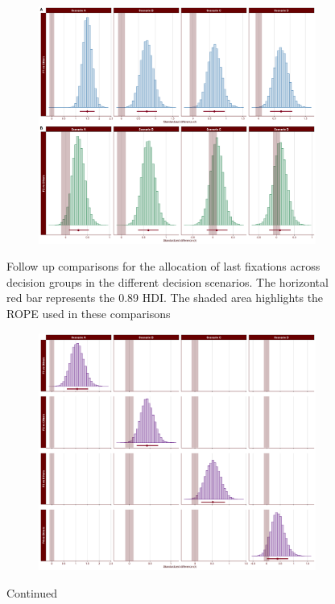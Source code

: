 \documentclass[
  english,
  man]{apa6}
\begin{document}
\begin{appendix}
\begin{figure}[!b]
\centering
\begin{subfigure}{1\textwidth}
\includegraphics[width=\linewidth]{Figures/SE2_last_scenario_comparisons_A.png}
\label{fig:last-scenario-comparisons-A}
\end{subfigure}
\caption[]{Follow up comparisons for the allocation of last fixations across decision groups in the different decision scenarios. The horizontal red bar represents the 0.89 HDI. The shaded area highlights the ROPE used in these comparisons}
\end{figure}

\medskip

\begin{figure}[ht]\ContinuedFloat
\centering
\begin{subfigure}{1\textwidth}
\includegraphics[width=\linewidth]{Figures/SE2_last_scenario_comparisons_B.png}
\label{fig:last-scenario-comparisons-B}
\end{subfigure}
\caption[]{Continued}
\end{figure}


\end{appendix}
\end{document}
